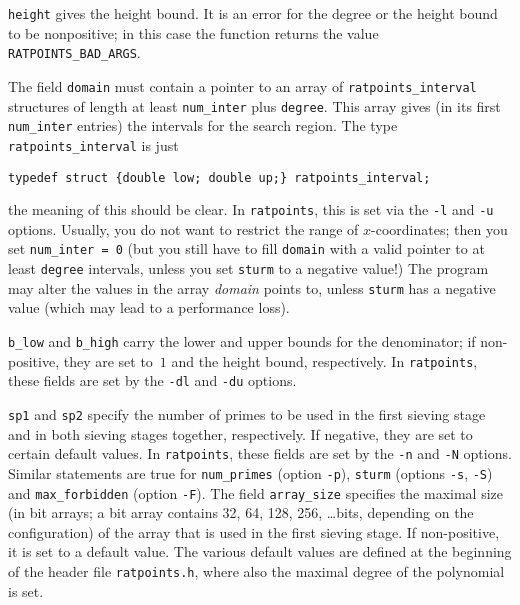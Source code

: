 \documentclass[12pt,a4paper,oneside]{amsart}
\begin{document}
\texttt{height} gives the height bound. It is an error for the
degree or the height bound to be nonpositive; in this case the function
returns the value \texttt{RATPOINTS\_BAD\_ARGS}.

The field \texttt{domain} must contain a pointer to an array of
\texttt{ratpoints\_interval} structures of length at least \texttt{num\_inter}
plus \texttt{degree}. This array gives (in its first \texttt{num\_inter} entries)
the intervals for the search region. The type \texttt{ratpoints\_interval}
is just

\begin{verbatim}
typedef struct {double low; double up;} ratpoints_interval;
\end{verbatim}

the meaning of this should be clear. In \texttt{ratpoints}, this is set
via the \verb+-l+ and \verb+-u+ options. Usually, you do not want to
restrict the range of $x$-coordinates; then you set \texttt{num\_inter = 0}
(but you still have to fill \texttt{domain} with a valid pointer to at least
\texttt{degree} intervals, unless you set \texttt{sturm} to a negative value!)
The program may alter the values in the array {\em domain} points to,
unless \texttt{sturm} has a negative value (which may lead to a performance loss).

\texttt{b\_low} and \texttt{b\_high}
carry the lower and upper bounds for the denominator; if non-positive, they are
set to~$1$ and the height bound, respectively. In \texttt{ratpoints}, these
fields are set by the \verb+-dl+ and \verb+-du+ options.

\texttt{sp1} and \texttt{sp2}
specify the number of primes to be used in the first sieving stage and
in both sieving stages together, respectively. If negative, they are set
to certain default values. In \texttt{ratpoints}, these fields are set by the
\verb+-n+ and \verb+-N+ options. Similar statements are true for
\texttt{num\_primes} (option \verb+-p+), \texttt{sturm} (options \verb+-s+,
\verb+-S+) and \texttt{max\_forbidden} (option \verb+-F+). The field
\texttt{array\_size} specifies the maximal size (in bit arrays; a bit array
contains 32, 64, 128, 256, \dots bits, depending on the configuration) of the
array that is used in the first sieving stage. If non-positive, it is
set to a default value. The various default values are defined at the
beginning of the header file \texttt{ratpoints.h}, where also the maximal
degree of the polynomial is set.
\end{document}
